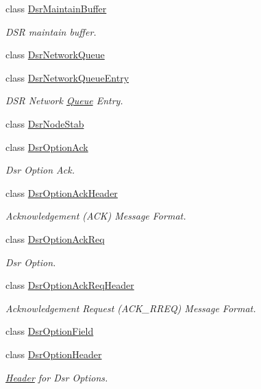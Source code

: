 \begin{DoxyCompactItemize}
class \hyperlink{classns3_1_1dsr_1_1DsrMaintainBuffer}{Dsr\+Maintain\+Buffer}
\begin{DoxyCompactList}\small\item\em D\+SR maintain buffer. \end{DoxyCompactList}\item 
class \hyperlink{classns3_1_1dsr_1_1DsrNetworkQueue}{Dsr\+Network\+Queue}
\item 
class \hyperlink{classns3_1_1dsr_1_1DsrNetworkQueueEntry}{Dsr\+Network\+Queue\+Entry}
\begin{DoxyCompactList}\small\item\em D\+SR Network \hyperlink{classns3_1_1Queue}{Queue} Entry. \end{DoxyCompactList}\item 
class \hyperlink{classns3_1_1dsr_1_1DsrNodeStab}{Dsr\+Node\+Stab}
\item 
class \hyperlink{classns3_1_1dsr_1_1DsrOptionAck}{Dsr\+Option\+Ack}
\begin{DoxyCompactList}\small\item\em Dsr Option Ack. \end{DoxyCompactList}\item 
class \hyperlink{classns3_1_1dsr_1_1DsrOptionAckHeader}{Dsr\+Option\+Ack\+Header}
\begin{DoxyCompactList}\small\item\em Acknowledgement (A\+CK) Message Format. \end{DoxyCompactList}\item 
class \hyperlink{classns3_1_1dsr_1_1DsrOptionAckReq}{Dsr\+Option\+Ack\+Req}
\begin{DoxyCompactList}\small\item\em Dsr Option. \end{DoxyCompactList}\item 
class \hyperlink{classns3_1_1dsr_1_1DsrOptionAckReqHeader}{Dsr\+Option\+Ack\+Req\+Header}
\begin{DoxyCompactList}\small\item\em Acknowledgement Request (A\+C\+K\+\_\+\+R\+R\+EQ) Message Format. \end{DoxyCompactList}\item 
class \hyperlink{classns3_1_1dsr_1_1DsrOptionField}{Dsr\+Option\+Field}
\item 
class \hyperlink{classns3_1_1dsr_1_1DsrOptionHeader}{Dsr\+Option\+Header}
\begin{DoxyCompactList}\small\item\em \hyperlink{classns3_1_1Header}{Header} for Dsr Options. \end{DoxyCompactList}\item 

\end{DoxyCompactItemize}
